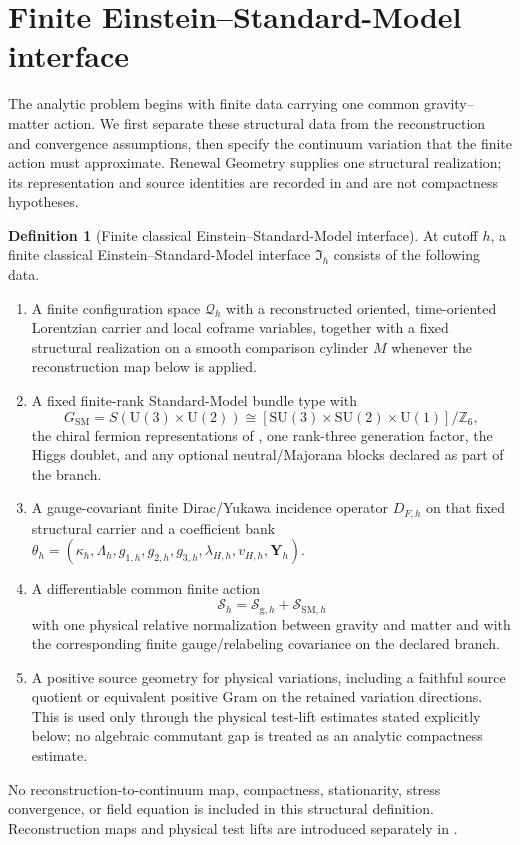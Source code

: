 \documentclass[11pt]{article}
\numberwithin{equation}{section}
\theoremstyle{definition}
\newtheorem{definition}[definition]{Definition}
\theoremstyle{remark}
\newcommand{\Z}{\mathbb Z}
\newcommand{\SU}{\mathrm{SU}}
\newcommand{\U}{\mathrm U}
\newcommand{\Sact}{\mathscr S}
\newcommand{\Iface}{\mathfrak I}
\begin{document}
\section{Finite Einstein--Standard-Model interface}
\label{sec:interface}

The analytic problem begins with finite data carrying one common
gravity--matter action. We first separate these structural data from the
reconstruction and convergence assumptions, then specify the continuum
variation that the finite action must approximate. Renewal Geometry supplies
one structural realization; its representation and source identities are
recorded in  and are not compactness hypotheses.

\begin{definition}[Finite classical Einstein--Standard-Model interface]
\label{def:finite-interface}
At cutoff $h$, a finite classical Einstein--Standard-Model interface $\Iface_h$ consists of the following data.
\begin{enumerate}[label=\textup{(I\arabic*)},leftmargin=3.2em]
\item A finite configuration space $\mathcal Q_h$ with a reconstructed oriented, time-oriented Lorentzian carrier and local coframe variables, together with a fixed structural realization on a smooth comparison cylinder $M$ whenever the reconstruction map below is applied.
\item A fixed finite-rank Standard-Model bundle type with
\begin{equation}
 G_{\mathrm{SM}}=S(\U(3)\times\U(2))
 \cong[\SU(3)\times\SU(2)\times\U(1)]/\Z_6,
 \label{eq:gauge-group}
\end{equation}
the chiral fermion representations of , one rank-three generation factor, the Higgs doublet, and any optional neutral/Majorana blocks declared as part of the branch.
\item A gauge-covariant finite Dirac/Yukawa incidence operator $D_{F,h}$ on that fixed structural carrier and a coefficient bank $\theta_h=(\kappa_h,\Lambda_h,g_{1,h},g_{2,h},g_{3,h},\lambda_{H,h},v_{H,h},\boldsymbol Y_h)$.
\item A differentiable common finite action
\[
 \Sact_h=\Sact_{\mathrm g,h}+\Sact_{\mathrm{SM},h}
\]
with one physical relative normalization between gravity and matter and with the corresponding finite gauge/relabeling covariance on the declared branch.
\item A positive source geometry for physical variations, including a faithful source quotient or equivalent positive Gram on the retained variation directions. This is used only through the physical test-lift estimates stated explicitly below; no algebraic commutant gap is treated as an analytic compactness estimate.
\end{enumerate}
No reconstruction-to-continuum map, compactness, stationarity, stress convergence, or field equation is included in this structural definition. Reconstruction maps and physical test lifts are introduced separately in .
\end{definition}
\end{document}
